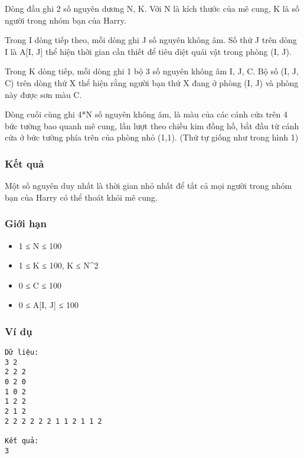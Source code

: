 Dòng đầu ghi 2 số nguyên dương N, K. Với N là kích thước của mê cung, K là số người trong nhóm bạn của Harry.

Trong I dòng tiếp theo, mỗi dòng ghi J số nguyên không âm. Số thứ J trên dòng I là A[I, J] thể hiện thời gian cần thiết để tiêu diệt quái vật trong phòng (I, J).

Trong K dòng tiếp, mỗi dòng ghi 1 bộ 3 số nguyên không âm I, J, C. Bộ số (I, J, C) trên dòng thứ X thể hiện rằng người bạn thứ X đang ở phòng (I, J) và phòng này được sơn màu C.

Dòng cuối cùng ghi 4*N số nguyên không âm, là màu của các cánh cửa trên 4 bức tường bao quanh mê cung, lần lượt theo chiều kim đồng hồ, bắt đầu từ cánh cửa ở bức tường phía trên của phòng nhỏ (1,1). (Thứ tự giống như trong hình 1)

\subsubsection{Kết quả}

Một số nguyên duy nhất là thời gian nhỏ nhất để tất cả mọi người trong nhóm bạn của Harry có thể thoát khỏi mê cung.

\subsubsection{Giới hạn}
\begin{itemize}
	\item 1 ≤ N ≤ 100
	\item 1 ≤ K ≤ 100, K ≤ N\textasciicircum2
	\item 0 ≤ C ≤ 100
	\item 0 ≤ A[I, J] ≤ 100
\end{itemize}

\subsubsection{Ví dụ}
\begin{verbatim}
Dữ liệu:
3 2
2 2 2
0 2 0
1 0 2
1 2 2
2 1 2
2 2 2 2 2 2 1 1 2 1 1 2

Kết quả:
3
\end{verbatim}
